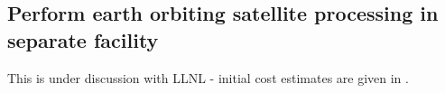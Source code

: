 
\subsection{Perform earth orbiting satellite processing in separate facility} \label{sec:5perform}
This is under discussion with LLNL - initial cost estimates are given in .
